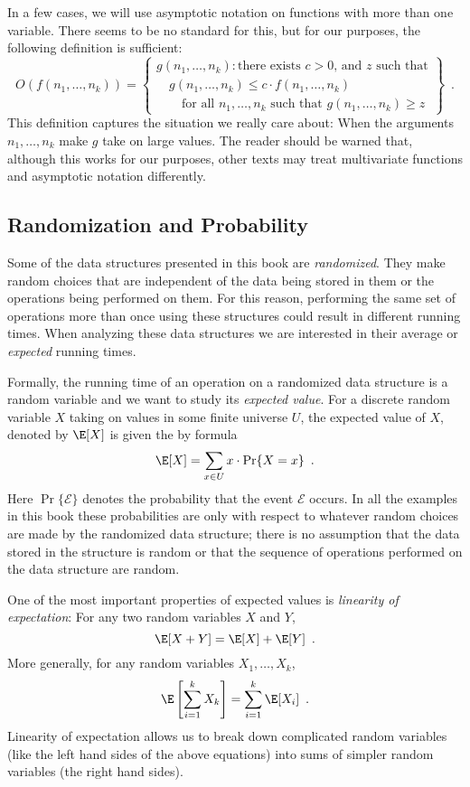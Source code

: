 In a few cases, we will use asymptotic notation on functions with more than one variable. There seems to be no standard for this, but for our purposes, the following definition is sufficient:
\[
   O(f(n_1,\ldots,n_k)) = 
   \left\{\begin{array}{lll}
             g(n_1,\ldots,n_k):\mbox{there exists $c>0$, and $z$ such that} \\
             \quad \mbox{$g(n_1,\ldots,n_k) \le c\cdot f(n_1,\ldots,n_k)$} \\
             \qquad \mbox{for all $n_1,\ldots,n_k$ such that $g(n_1,\ldots,n_k)\ge z$}   
   \end{array}\right\} \enspace .
\]
This definition captures the situation we really care about:  When the
arguments $n_1,\ldots,n_k$ make $g$ take on large values.  The reader
should be warned that, although this works for our purposes, other texts
may treat multivariate functions and asymptotic notation differently.

\subsection{Randomization and Probability}

Some of the data structures presented in this book are \emph{randomized}.
They make random choices that are independent of the data being stored
in them or the operations being performed on them.  For this reason,
performing the same set of operations more than once using these
structures could result in different running times.  When analyzing these
data structures we are interested in their average or \emph{expected}
running times.

Formally, the running time of an operation on a randomized data structure
is a random variable and we want to study its \emph{expected value}. For
a discrete random variable $X$ taking on values in some finite universe
$U$, the expected value of $X$, denoted by $\E[X]$ is given the by formula
\[
    \E[X] = \sum_{x\in U} x\cdot\Pr\{X=x\} \enspace .
\]
Here $\Pr\{\mathcal{E}\}$ denotes the probability that the event
$\mathcal{E}$ occurs.  In all the examples in this book these
probabilities are only with respect to whatever random choices are made by
the randomized data structure;  there is no assumption that the data
stored in the structure is random or that the sequence of operations
performed on the data structure are random.

One of the most important properties of expected values is \emph{linearity
of expectation}:  For any two random variables $X$ and $Y$,
\[
   \E[X+Y] = \E[X] + \E[Y] \enspace .
\]
More generally, for any random variables $X_1,\ldots,X_k$,
\[
   \E\left[\sum_{i=1}^k X_k\right] = \sum_{i=1}^k \E[X_i] \enspace .
\]
Linearity of expectation allows us to break down complicated random variables (like the left hand sides of the above equations) into sums of simpler random variables (the right hand sides).


